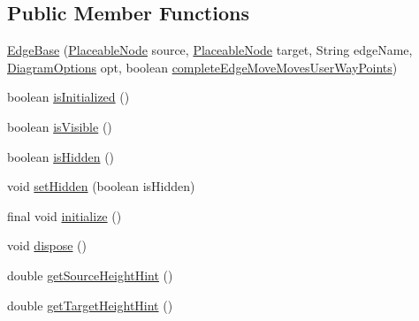 \subsection*{Public Member Functions}
\begin{DoxyCompactItemize}
\item 
\hyperlink{classorg_1_1tzi_1_1use_1_1gui_1_1views_1_1diagrams_1_1elements_1_1edges_1_1_edge_base_af83a50316349f10d8e2ff48d2a4b0e72}{Edge\-Base} (\hyperlink{classorg_1_1tzi_1_1use_1_1gui_1_1views_1_1diagrams_1_1elements_1_1_placeable_node}{Placeable\-Node} source, \hyperlink{classorg_1_1tzi_1_1use_1_1gui_1_1views_1_1diagrams_1_1elements_1_1_placeable_node}{Placeable\-Node} target, String edge\-Name, \hyperlink{classorg_1_1tzi_1_1use_1_1gui_1_1views_1_1diagrams_1_1_diagram_options}{Diagram\-Options} opt, boolean \hyperlink{classorg_1_1tzi_1_1use_1_1gui_1_1views_1_1diagrams_1_1elements_1_1edges_1_1_edge_base_ad97a3ce3074b08b65550e796d09f8e42}{complete\-Edge\-Move\-Moves\-User\-Way\-Points})
\item 
boolean \hyperlink{classorg_1_1tzi_1_1use_1_1gui_1_1views_1_1diagrams_1_1elements_1_1edges_1_1_edge_base_a7c682d04e43ba7eef43fe9beb60465e9}{is\-Initialized} ()
\item 
boolean \hyperlink{classorg_1_1tzi_1_1use_1_1gui_1_1views_1_1diagrams_1_1elements_1_1edges_1_1_edge_base_af804411605071228adf741c21a288add}{is\-Visible} ()
\item 
boolean \hyperlink{classorg_1_1tzi_1_1use_1_1gui_1_1views_1_1diagrams_1_1elements_1_1edges_1_1_edge_base_a36fc8bf1fb08384d628ce6c6be1e8c9e}{is\-Hidden} ()
\item 
void \hyperlink{classorg_1_1tzi_1_1use_1_1gui_1_1views_1_1diagrams_1_1elements_1_1edges_1_1_edge_base_a630ec2fb42cee06ba22521b2eaed8172}{set\-Hidden} (boolean is\-Hidden)
\item 
final void \hyperlink{classorg_1_1tzi_1_1use_1_1gui_1_1views_1_1diagrams_1_1elements_1_1edges_1_1_edge_base_a6392d1504cf5a44cb0f7b5bf59f75533}{initialize} ()
\item 
void \hyperlink{classorg_1_1tzi_1_1use_1_1gui_1_1views_1_1diagrams_1_1elements_1_1edges_1_1_edge_base_aaa2ae540d6b181bfd5db827958d2e328}{dispose} ()
\item 
double \hyperlink{classorg_1_1tzi_1_1use_1_1gui_1_1views_1_1diagrams_1_1elements_1_1edges_1_1_edge_base_a5bab8506f4b9138cd466c8aabf8ce203}{get\-Source\-Height\-Hint} ()
\item 
double \hyperlink{classorg_1_1tzi_1_1use_1_1gui_1_1views_1_1diagrams_1_1elements_1_1edges_1_1_edge_base_aec389fb50ef4092262823a20637fc40a}{get\-Target\-Height\-Hint} ()

\end{DoxyCompactItemize}
